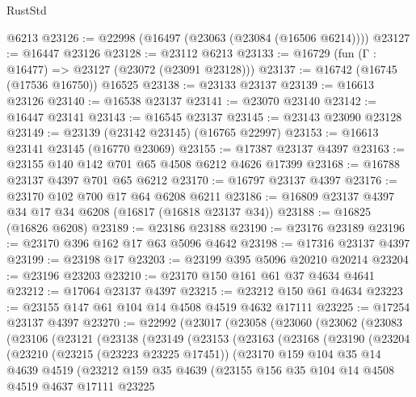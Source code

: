 \begin{lexlean}{RustStd}
\begin{coremodule}
{\begin{coremodule}
{{{{{{{{{{{{{{{{{{{{{{{{{{{{{{{{{{{{{{{{{{{{{{{{{{{{{{{    @6213
@23126 := @22998 (@16497 (@23063 (@23084 (@16506 @6214))))
@23127 := @16447 @23126
@23128 := @23112 @6213
@23133 := @16729 (fun (Γ : @16477) => @23127 (@23072 (@23091 @23128)))
@23137 := @16742 (@16745 (@17536 @16750)) @16525
@23138 := @23133 @23137
@23139 := @16613 @23126
@23140 := @16538 @23137
@23141 := @23070 @23140
@23142 := @16447 @23141
@23143 := @16545 @23137
@23145 := @23143 @23090 @23128
@23149 := @23139 (@23142 @23145) (@16765 @22997)
@23153 := @16613 @23141 @23145 (@16770 @23069)
@23155 := @17387 @23137 @4397
@23163 := @23155 @140 @142 @701 @65 @4508 @6212 @4626 @17399
@23168 := @16788 @23137 @4397 @701 @65 @6212
@23170 := @16797 @23137 @4397
@23176 := @23170 @102 @700 @17 @64 @6208 @6211
@23186 := @16809 @23137 @4397 @34 @17 @34 @6208 (@16817 (@16818 @23137 @34))
@23188 := @16825 (@16826 @6208)
@23189 := @23186 @23188
@23190 := @23176 @23189
@23196 := @23170 @396 @162 @17 @63 @5096 @4642
@23198 := @17316 @23137 @4397
@23199 := @23198 @17
@23203 := @23199 @395 @5096 @20210 @20214
@23204 := @23196 @23203
@23210 := @23170 @150 @161 @61 @37 @4634 @4641
@23212 := @17064 @23137 @4397
@23215 := @23212 @150 @61 @4634
@23223 := @23155 @147 @61 @104 @14 @4508 @4519 @4632 @17111
@23225 := @17254 @23137 @4397
@23270 := @22992
    (@23017
      (@23058
        (@23060
          (@23062
            (@23083
              (@23106
                (@23121
                  (@23138
                    (@23149
                      (@23153
                        (@23163
                          (@23168
                            (@23190
                              (@23204
                                (@23210
                                  (@23215 (@23223 @23225 @17451))
                                  (@23170
                                    @159
                                    @104
                                    @35
                                    @14
                                    @4639
                                    @4519
                                    (@23212
                                      @159
                                      @35
                                      @4639
                                      (@23155
                                        @156
                                        @35
                                        @104
                                        @14
                                        @4508
                                        @4519
                                        @4637
                                        @17111
                                        @23225
}}}}}}}}}}}}}}}}}}}}}}}}}}}}}}}}}}}}}}}}}}}}}}}}}}}}}}}
\end{coremodule}}
\end{coremodule}
\end{lexlean}
